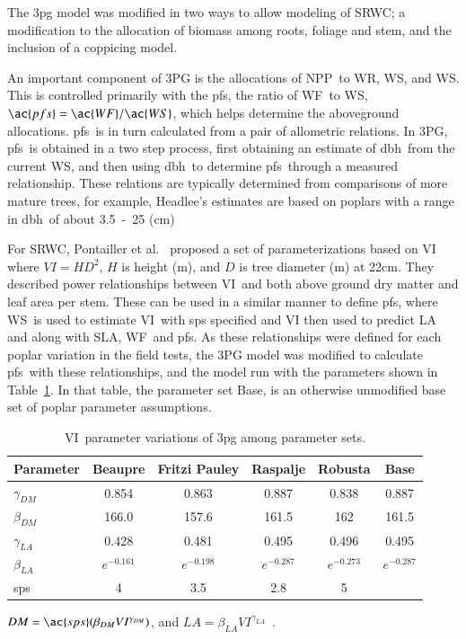 \documentclass[preprint,12pt]{elsarticle}
\begin{document}
The \ac{3pg} model was modified in two ways to allow modeling of
\ac{SRWC}; a modification to the allocation of biomass among roots,
foliage and stem, and the inclusion of a coppicing model.

An important component of 3PG is the allocations of \ac{NPP}~to \ac{WR}, \ac{WS}, and
\ac{WS}.  This is controlled primarily with the \ac{pfs}, the ratio of \ac{WF}~to \ac{WS},
$\ac{pfs}=\ac{WF}/\ac{WS}$, which helps determine the aboveground allocations.  \ac{pfs}~is in
turn calculated from a pair of allometric relations.  In 3PG, \ac{pfs}~is obtained
in a two step process, first obtaining an estimate of \ac{dbh}~from the current \ac{WS},
and then using \ac{dbh}~to determine \ac{pfs}~through a measured relationship.  These
relations are typically determined from comparisons of more mature trees, for
example, Headlee's estimates are based on poplars with a range in \ac{dbh}~of about
3.5~-~25 (cm)~\cite{Headlee2012}%

For \ac{SRWC}, Pontailler et al.~\cite{pontailler97-volume-index}
proposed a set of parameterizations based on \ac{VI} where $VI =
HD^2$, $H$ is height (m), and $D$ is tree diameter (m) at 22cm.  They
described power relationships between \ac{VI}~and both above ground
dry matter and leaf area per stem. These can be used in a similar
manner to define \ac{pfs}, where \ac{WS}~is used to estimate
\ac{VI}~with \ac{sps} specified and \ac{VI} then used to predict
\ac{LA} and along with \ac{SLA}, \ac{WF}~and \ac{pfs}. As these
relationships were defined for each poplar variation in the field
tests, the 3PG model was modified to calculate \ac{pfs}~with these
relationships, and the model run with the parameters shown in
Table~\ref{tab:pont-3pg}.  In that table, the parameter set Base, is
an otherwise unmodified base set of poplar parameter assumptions.

\begin{table}%
  \caption{\ac{VI}~parameter variations of \ac{3pg} among parameter sets.}
  \begin{tabular}{|l|c|c|c|c|c|}
    \hline
    Parameter & Beaupre & Fritzi Pauley & Raspalje & Robusta & Base\\
    \hline
    $\gamma_{DM}$ &  0.854 & 0.863 & 0.887 & 0.838 & 0.887\\
    $\beta_{DM}$  & 166.0 & 157.6 & 161.5 & 162 & 161.5\\
    $\gamma_{LA}$ &  0.428 &  0.481 & 0.495 & 0.496 & 0.495\\ 
    $\beta_{LA}$ & $e^{-0.161}$ & $e^{-0.198}$ & $e^{-0.287}$ & $e^{-0.273}$ & $e^{-0.287}$\\
    \ac{sps} & 4 & 3.5 & 2.8 & 5 \\
    \hline 
  \end{tabular}
  \begin{flushleft}$DM=\ac{sps}(\beta_{DM} VI^{\gamma_{DM}})$, and $LA = \beta_{LA} VI^{\gamma_{LA}}$~\cite{pontailler97-volume-index}.
\end{flushleft}  
\label{tab:pont-3pg}
\end{table}
\end{document}
